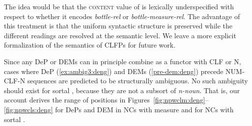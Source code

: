 \documentclass[output=paper,colorlinks,citecolor=brown]{langscibook}
\begin{document}
{ \ex %
 \z
 \z
 

 

The idea would be that the \textsc{content} value of  is lexically underspecified with respect to whether it encodes \textit{bottle-rel} or \textit{bottle-measure-rel}. The advantage of this treatment is that the uniform syntactic structure is preserved while the different readings are resolved at the semantic level. We leave a more explicit formalization of the semantics of CLFPs for future work.}  Since any DeP or DEMs can in principle combine as a functor with  CLF or  N, cases where DeP (\ref{ex:ambig3:deng}) and DEMs (\ref{pre-dem:deng}) precede NUM-CLF-N sequences are predicted to be structurally ambiguous. No such ambiguity should exist for sortal , because they are not a subsort of \textit{n-noun}.  That is, our account derives the range of positions in Figures~\ref{fig:npwclm:deng}--\ref{fig:npwcls:deng} for DePs and DEM in NCs with measure   and for NCs with sortal .

\end{document}
